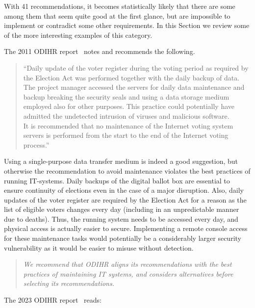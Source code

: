 \documentclass{llncs}
\begin{document}
With 41 recommendations, it becomes statistically likely that there are some among them that seem quite good at the first glance, but are impossible to implement or contradict some other requirements. In this Section we review some of the more interesting examples of this category.

The 2011 ODIHR report~\cite{ODIHR2011} notes and recommends the following.

\begin{quote}
    ``Daily update of the voter register during the voting period as required by the Election Act was performed together with the daily backup of data. The project manager accessed the servers for daily data maintenance and backup breaking the security seals and using a data storage medium employed also for other purposes. This practice could potentially have admitted the undetected intrusion of viruses and malicious software. \\[1ex]
    It is recommended that no maintenance of the Internet voting system servers is performed from the start to the end of the Internet voting process.''
\end{quote}

Using a single-purpose data transfer medium is indeed a good suggestion, but otherwise the recommendation to avoid maintenance violates the best practices of running IT-systems. Daily backups of the digital ballot box are essential to ensure continuity of elections even in the case of a major disruption. Also, daily updates of the voter register are required by the Election Act for a reason as the list of eligible voters changes every day (including in an unpredictable manner due to deaths). Thus, the running system needs to be accessed every day, and physical access is actually easier to secure. Implementing a remote console access for these maintenance tasks would potentially be a considerably larger security vulnerability as it would be easier to misuse without detection.

\begin{quote}
    \emph{We recommend that ODIHR aligns its recommendations with the best practices of maintaining IT systems, and considers alternatives before selecting its recommendations.}
\end{quote}
The 2023 ODIHR report~\cite{ODIHR2023} reads:
\end{document}
